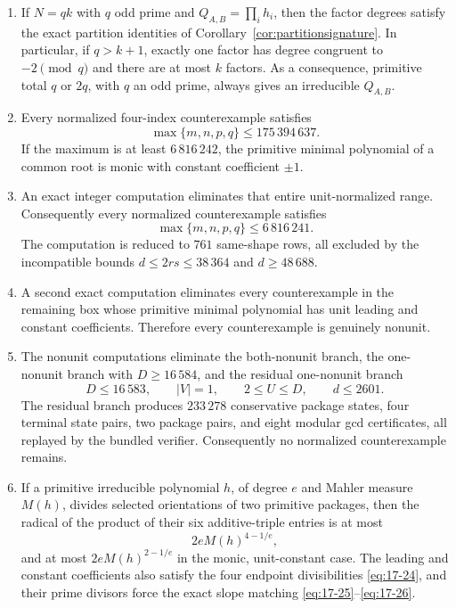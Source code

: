 \documentclass[11pt]{article}
\numberwithin{equation}{section}
\theoremstyle{definition}
\begin{document}
\begin{enumerate}[label=(\roman*)]
\item If \(N=qk\) with \(q\) odd prime and
\(Q_{A,B}=\prod_i h_i\), then the factor degrees satisfy the exact
partition identities of Corollary~\ref{cor:partitionsignature}.  In
particular, if \(q>k+1\), exactly one factor has degree congruent to
\(-2\pmod q\) and there are at most \(k\) factors.  As a consequence,
primitive total \(q\) or \(2q\), with \(q\) an odd prime, always gives
an irreducible \(Q_{A,B}\).

\item Every normalized four-index counterexample satisfies
\[
 \max\{m,n,p,q\}\leq175\,394\,637.
\]
If the maximum is at least \(6\,816\,242\), the primitive minimal polynomial
of a common root is monic with constant coefficient \(\pm1\).

\item An exact integer computation eliminates that entire unit-normalized
range.  Consequently every normalized counterexample satisfies
\[
 \boxed{\max\{m,n,p,q\}\leq6\,816\,241.}
\]
The computation is reduced to \(761\) same-shape rows, all excluded by the
incompatible bounds \(d\leq2rs\leq38\,364\) and \(d\geq48\,688\).

\item A second exact computation eliminates every counterexample in the
remaining box whose primitive minimal polynomial has unit leading and
constant coefficients.  Therefore every counterexample is genuinely
nonunit.

\item The nonunit computations eliminate the both-nonunit branch, the
one-nonunit branch with \(D\geq16\,584\), and the residual
one-nonunit branch
\[
 D\leq16\,583,\qquad |V|=1,\qquad 2\leq U\leq D,\qquad d\leq2601.
\]
The residual branch produces \(233\,278\) conservative package states, four
terminal state pairs, two package pairs, and eight modular gcd certificates,
all replayed by the bundled verifier.  Consequently no normalized
counterexample remains.

\item If a primitive irreducible polynomial \(h\), of degree \(e\) and
Mahler measure \(M(h)\), divides selected orientations of two primitive
packages, then the radical of the product of their six additive-triple
entries is at most
\[
 2eM(h)^{4-1/e},
\]
and at most \(2eM(h)^{2-1/e}\) in the monic, unit-constant case.  The
leading and constant coefficients also satisfy the four endpoint
divisibilities \eqref{eq:17-24}, and their prime divisors force the exact slope
matching \eqref{eq:17-25}--\eqref{eq:17-26}.
\end{enumerate}
\end{document}
